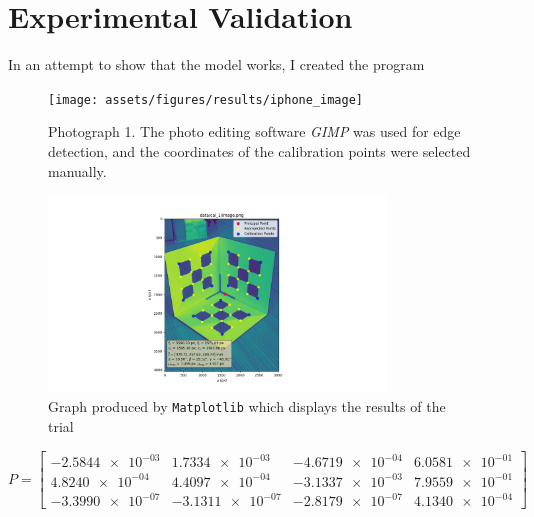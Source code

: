 \section{Experimental Validation}

In an attempt to show that the model works, I created the program

\begin{figure}[H]
    \centering
    \texttt{[image: assets/figures/results/iphone\_image]}
    \caption{Photograph 1. The photo editing software \emph{GIMP} was used for edge detection, and the coordinates of the calibration points were selected manually. }
\end{figure}



\begin{figure}[H]
    \centering
    \includegraphics[width=0.8\textwidth]{assets/figures/results/iphone_graph}
    \caption{Graph produced by \texttt{Matplotlib} which displays the results of the trial}
\end{figure}

\begin{equation*}
    P =
    \begin{bmatrix}
        \num{-2.5844e-03} & \num{1.7334e-03}  & \num{-4.6719e-04} & \num{6.0581e-01} \\
        \num{4.8240e-04}  & \num{4.4097e-04}  & \num{-3.1337e-03} & \num{7.9559e-01} \\
        \num{-3.3990e-07} & \num{-3.1311e-07} & \num{-2.8179e-07} & \num{4.1340e-04}
    \end{bmatrix}
\end{equation*}

